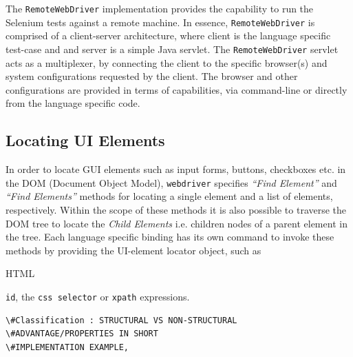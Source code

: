 The \texttt{RemoteWebDriver} implementation provides the capability to run the Selenium tests against a remote machine. In essence, \texttt{RemoteWebDriver} is comprised of a client-server architecture, where client is the language specific test-case and and server is a simple Java servlet. The \texttt{RemoteWebDriver} servlet acts as a multiplexer, by connecting the client to the specific browser(s) and system configurations requested by the client. The browser and other configurations are provided in terms of capabilities, via command-line or directly from the language specific code.

\subsection{Locating UI Elements}
\label{ssec:locatingUIElements}
In order to locate GUI elements such as input forms, buttons, checkboxes etc. in the DOM (Document Object Model), \texttt{webdriver} specifies \textit{``Find Element''} and \textit{``Find Elements''} methods for locating a single element and a list of elements, respectively. Within the scope of these methods it is also possible to traverse the DOM tree to locate the \textit{Child Elements} i.e. children nodes of a parent element in the tree. Each language specific binding has its own command to invoke these methods by providing the UI-element locator object, such as\begin{small} HTML\end{small} \texttt{id}, the \texttt{css selector} or \texttt{xpath} expressions.

\begin{verbatim}
\#Classification : STRUCTURAL VS NON-STRUCTURAL
\#ADVANTAGE/PROPERTIES IN SHORT
\#IMPLEMENTATION EXAMPLE,
\end{verbatim}

